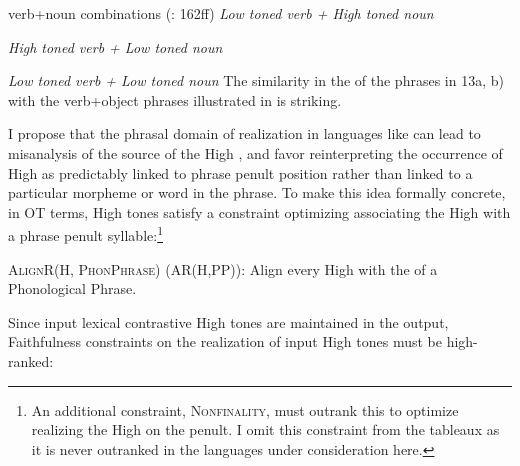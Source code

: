 \documentclass[output=paper,newtxmath,modfonts,nonflat,draft]{langsci/langscibook}
\begin{document}
\largerpage 
\ea\label{ex:downing:13}  verb+noun combinations (\citealt{Kisseberth1984}: 162ff)
\ea\label{ex:downing:13a} \textit{Low toned verb + High toned noun}
\sn
{}
\sn
{}
\sn
{}

\ex\label{ex:downing:13b}  \textit{High toned verb + Low toned noun}
\sn
{}
\sn
{}
\sn
{}
\sn
{}

\ex\label{ex:downing:13c}\textit{Low toned verb + Low toned noun}
\sn
{}
\sn
{}
\z
\z
The similarity in the  of the  phrases in 13a, b) with the  verb+object phrases illustrated in  is striking.

I propose that the phrasal domain of  realization in languages like  can lead to misanalysis of the source of the High , and favor reinterpreting the occurrence of High  as predictably linked to phrase penult position rather than linked to a particular morpheme or word in the phrase. To make this idea formally concrete, in OT terms,  High tones satisfy a constraint optimizing associating the High  with a phrase penult syllable:\footnote{An additional constraint, \textsc{Nonfinality,} must outrank this  to optimize realizing the High  on the penult. I omit this constraint from the tableaux as it is never outranked in the languages under consideration here.}


\ea\label{ex:downing:14}\textsc{AlignR(H, PhonPhrase}) (AR(H,PP)):
\sn
Align every High  with the  of a Phonological Phrase.
\z 

Since input lexical contrastive High tones are maintained in the output, Faithfulness constraints on the realization of input High tones must be high-ranked:
\end{document}
